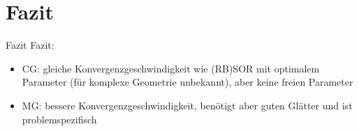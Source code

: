 \documentclass[aspectratio=169]{beamer}
\theoremstyle{thm}
\begin{document}
\section{Fazit}\label{sec:Fazit}
\begin{frame}{Fazit}
  Fazit:
  \begin{itemize}[<+(1)->]
    \item CG: gleiche Konvergenzgeschwindigkeit wie (RB)SOR mit optimalem
        Parameter (für komplexe Geometrie unbekannt), aber keine freien Parameter
    \item MG: bessere Konvergenzgeschwindigkeit, benötigt aber guten Glätter
        und ist problemspezifisch
  \end{itemize}
\end{frame}
\end{document}
